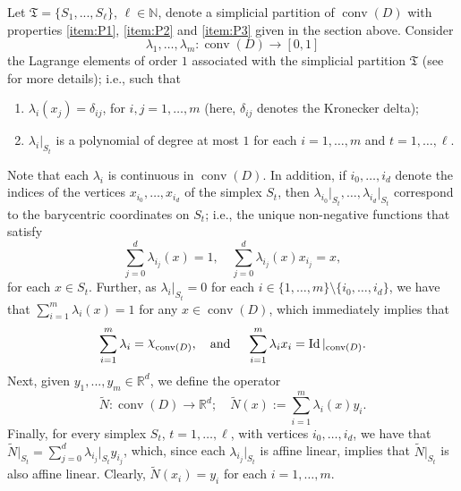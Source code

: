 \documentclass[onefignum,onetabnum]{siamonline250211}
\newcommand{\Id}{\operatorname{Id}}
\newcommand{\R}{\mathbb{R}}
\newcommand{\conv}{\operatorname{conv}}
\DeclareRobustCommand{\Chi}{{\mathpalette\irchi\relax}}
\newcommand{\irchi}[2]{\raisebox{\depth}{$#1\chi$}} %
\begin{document}
Let $\mathfrak{T}=\{S_1,...,S_\ell\}$, $\ell\in\mathbb{N}$, denote a simplicial partition of $\conv(D)$ with properties \ref{item:P1}, \ref{item:P2} and \ref{item:P3} given in the section above. Consider
$$
\lambda_1,\ldots, \lambda_m\colon\conv(D)\to[0, 1]
$$ 
the Lagrange elements of order $1$ associated with the simplicial partition $\mathfrak{T}$ (see \cite[Chapter 4]{Quarteroni2017} for more details); i.e., such that
\begin{enumerate}[label=(\roman*),leftmargin=*]
\item $\lambda_i(x_j)=\delta_{ij}$, for $i, j = 1,\ldots, m$ (here, $\delta_{ij}$ denotes the Kronecker delta);
\item $ \lambda_i\vert_{S_t}$ is a polynomial of degree at most $1$ for each  $i=1,\ldots, m$ and $t=1,\ldots, \ell$.
\end{enumerate}
Note that each $\lambda_i$ is continuous in $\conv(D)$. In addition, if $i_0,\ldots, i_d$ denote the indices of the vertices $x_{i_0}, \ldots, x_{i_d}$ of the simplex $S_t$, then $\lambda_{i_0}\vert_{S_t},\ldots, \lambda_{i_d}\vert_{S_t}$ correspond to the barycentric coordinates on $S_t$; i.e., the unique non-negative functions that satisfy
\begin{equation}\label{eq:barcoords}
\sum_{j=0}^d \lambda_{i_j}(x)=1, \quad \sum_{j=0}^d\lambda_{i_j}(x)x_{i_j}=x,
\end{equation}
for each $x\in S_t$. Further, as $\lambda_i\vert_{S_t}=0$ for each $i\in\{1,\ldots, m\}\setminus\{i_0,\ldots, i_d\}$, we have that $\sum_{i=1}^m\lambda_i(x)=1$ for any $x\in\conv(D)$, which immediately implies that 
$$
\sum_{i=1}^m\lambda_i=\Chi_{\conv(D)},\quad \text{and } \quad \sum_{i=1}^m\lambda_i x_i=\Id\vert_{\conv(D)}.
$$ 
Next, given $y_1,..., y_m\in\R^d$, we define the operator
\begin{equation}\label{eq:def_of_Ntilde}
\widetilde{N}\colon\conv(D)\to\R^d; \quad \widetilde{N}(x):=\sum_{i=1}^m\lambda_i(x)y_i.
\end{equation}
Finally, for every simplex $S_t$, $t=1,\ldots, \ell$, with vertices $i_0,\ldots, i_d$, we have that $\widetilde{N}\vert_{S_t}=\sum_{j=0}^d \lambda_{i_j}\vert_{S_t}y_{i_j}$, which, since each $\lambda_{i_j}\vert_{S_t}$ is affine linear, implies that $\widetilde{N}\vert_{S_t}$ is also affine linear. Clearly, $\widetilde{N}(x_i)=y_i$ for each $i=1,\ldots, m$.
\end{document}
